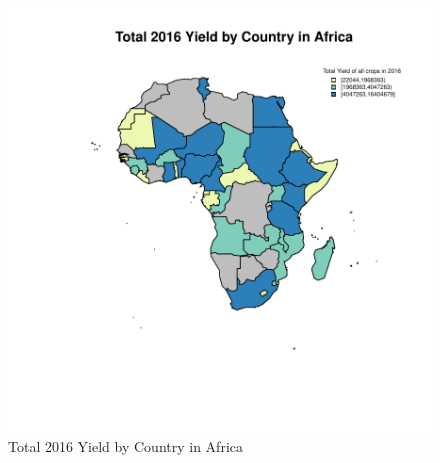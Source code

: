 \documentclass{article}
\begin{document}
\begin{figure}[h]
\centering
\includegraphics{EXEC_2-loc}
\caption{Total 2016 Yield by Country in Africa}
\label{region_maps}
\end{figure}
\end{document}
